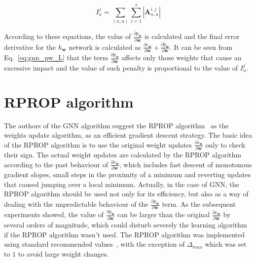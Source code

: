 \begin{equation}
I_u^j =  \sum_{(n, u)} \sum_{i = 1}^{s} |\bm{A}_{n, u}^{i, j}|
\label{eq:gnn_pw_inf}
\end{equation}

According to these equations, the value of $\frac{\partial p_{\bm{w}}}{\partial \bm{w}}$ is calculated and the final error derivative for the $h_{\bm{w}}$ network is calculated as $\frac{\partial e_{\bm{w}}}{\partial \bm{w}} + \frac{\partial p_{\bm{w}}}{\partial \bm{w}}$. It can be seen from Eq.~\ref{eq:gnn_pw_L} that the  term $\frac{\partial p_{\bm{w}}}{\partial \bm{w}}$ affects only those weights that cause an excessive impact and the value of such penalty is proportional to the value of $I_u^j$.


\section{RPROP algorithm}
The authors of the GNN algorithm suggest the RPROP algorithm~\cite{riedmiller1993direct} as the weights update algorithm, as an efficient gradient descent strategy. The basic idea of the RPROP algorithm is to use the original weight updates $\frac{\partial e_{\bm{w}}}{\partial \bm{w}}$ only to check their sign. The actual weight updates are calculated by the RPROP algorithm according to the past behaviour of $\frac{\partial e_{\bm{w}}}{\partial \bm{w}}$, which includes fast descent of monotonous gradient slopes, small steps in the proximity of a minimum and reverting updates that caused jumping over a local minimum. Actually, in the case of GNN, the RPROP algorithm should be used not only for its efficiency, but also as a way of dealing with the unpredictable behaviour of the $\frac{\partial p_{\bm{w}}}{\partial \bm{w}}$ term. As the subsequent experiments showed, the value of $\frac{\partial p_{\bm{w}}}{\partial \bm{w}}$ can be larger than the original $\frac{\partial e_{\bm{w}}}{\partial \bm{w}}$ by several orders of magnitude, which could disturb severely the learning algorithm if the RPROP algorithm wasn't used. The RPROP algorithm was implemented using standard recommended values~\cite{riedmiller1993direct}, with the exception of $\Delta_{max}$ which was set to $1$ to avoid large weight changes.


